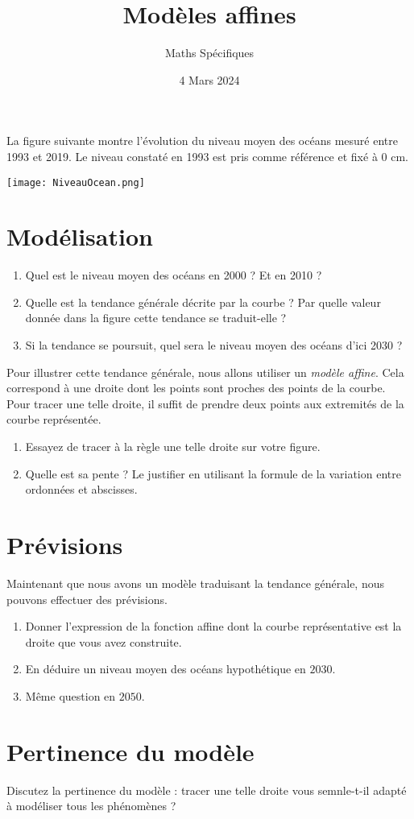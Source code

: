 \documentclass{article}
\author{Maths Spécifiques}
\date{4 Mars 2024}
\title{Modèles affines}
\begin{document}
\maketitle

La figure suivante montre l'évolution du niveau moyen des océans mesuré
entre 1993 et 2019. Le niveau constaté en 1993 est pris comme référence et
fixé à 0 cm.

\begin{center}
\texttt{[image: NiveauOcean.png]}
\end{center}
\section{Modélisation}
\begin{enumerate}
\item Quel est le niveau moyen des océans en 2000 ? Et en 2010 ?
\item Quelle est la tendance générale décrite par la courbe ? Par quelle valeur donnée dans la figure cette tendance se traduit-elle ?
\item Si la tendance se poursuit, quel sera le niveau moyen des océans d'ici 2030 ? 
\end{enumerate}
Pour illustrer cette tendance générale, nous allons utiliser un \emph{modèle affine}. Cela correspond à une droite dont les points sont proches des points de la courbe. Pour tracer une telle droite, il suffit de prendre deux points aux \og extremités \fg de la courbe représentée.
\begin{enumerate}[resume*]
\item Essayez de tracer à la règle une telle droite sur votre figure.
\item Quelle est sa pente ? Le justifier en utilisant la formule de la variation entre ordonnées et abscisses.
\end{enumerate}

\section{Prévisions}
Maintenant que nous avons un modèle traduisant la tendance générale, nous pouvons effectuer des prévisions.
\begin{enumerate}[resume*]
\item Donner l'expression de la fonction affine dont la courbe représentative est la droite que vous avez construite.
\item En déduire un niveau moyen des océans hypothétique en $2030$.
\item Même question en $2050$.
\end{enumerate}
\section{Pertinence du modèle}
Discutez la pertinence du modèle : tracer une telle droite vous semnle-t-il adapté à modéliser tous les phénomènes ?
\end{document}
